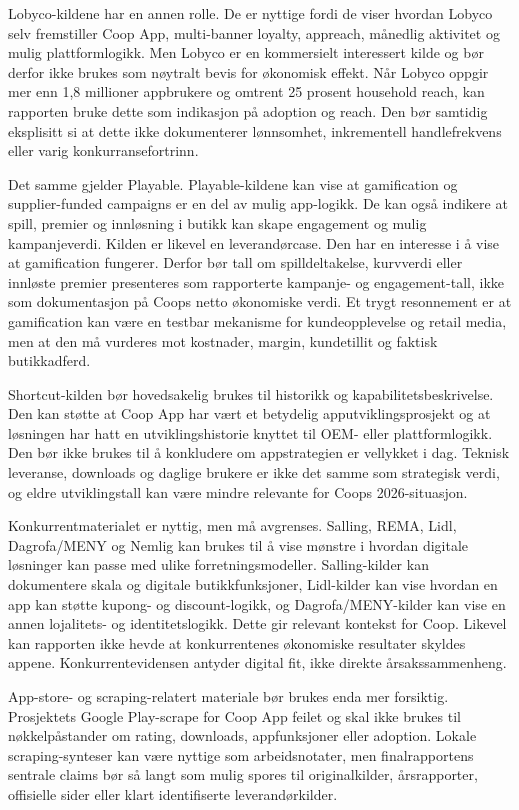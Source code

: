 \documentclass[12pt,a4paper]{article}
\begin{document}
Lobyco-kildene har en annen rolle. De er nyttige fordi de viser hvordan Lobyco selv fremstiller Coop App, multi-banner loyalty, appreach, månedlig aktivitet og mulig plattformlogikk. Men Lobyco er en kommersielt interessert kilde og bør derfor ikke brukes som nøytralt bevis for økonomisk effekt. Når Lobyco oppgir mer enn 1,8 millioner appbrukere og omtrent 25 prosent household reach, kan rapporten bruke dette som indikasjon på adoption og reach. Den bør samtidig eksplisitt si at dette ikke dokumenterer lønnsomhet, inkrementell handlefrekvens eller varig konkurransefortrinn.

Det samme gjelder Playable. Playable-kildene kan vise at gamification og supplier-funded campaigns er en del av mulig app-logikk. De kan også indikere at spill, premier og innløsning i butikk kan skape engagement og mulig kampanjeverdi. Kilden er likevel en leverandørcase. Den har en interesse i å vise at gamification fungerer. Derfor bør tall om spilldeltakelse, kurvverdi eller innløste premier presenteres som rapporterte kampanje- og engagement-tall, ikke som dokumentasjon på Coops netto økonomiske verdi. Et trygt resonnement er at gamification kan være en testbar mekanisme for kundeopplevelse og retail media, men at den må vurderes mot kostnader, margin, kundetillit og faktisk butikkadferd.

Shortcut-kilden bør hovedsakelig brukes til historikk og kapabilitetsbeskrivelse. Den kan støtte at Coop App har vært et betydelig apputviklingsprosjekt og at løsningen har hatt en utviklingshistorie knyttet til OEM- eller plattformlogikk. Den bør ikke brukes til å konkludere om appstrategien er vellykket i dag. Teknisk leveranse, downloads og daglige brukere er ikke det samme som strategisk verdi, og eldre utviklingstall kan være mindre relevante for Coops 2026-situasjon.

Konkurrentmaterialet er nyttig, men må avgrenses. Salling, REMA, Lidl, Dagrofa/MENY og Nemlig kan brukes til å vise mønstre i hvordan digitale løsninger kan passe med ulike forretningsmodeller. Salling-kilder kan dokumentere skala og digitale butikkfunksjoner, Lidl-kilder kan vise hvordan en app kan støtte kupong- og discount-logikk, og Dagrofa/MENY-kilder kan vise en annen lojalitets- og identitetslogikk. Dette gir relevant kontekst for Coop. Likevel kan rapporten ikke hevde at konkurrentenes økonomiske resultater skyldes appene. Konkurrentevidensen antyder digital fit, ikke direkte årsakssammenheng.

App-store- og scraping-relatert materiale bør brukes enda mer forsiktig. Prosjektets Google Play-scrape for Coop App feilet og skal ikke brukes til nøkkelpåstander om rating, downloads, appfunksjoner eller adoption. Lokale scraping-synteser kan være nyttige som arbeidsnotater, men finalrapportens sentrale claims bør så langt som mulig spores til originalkilder, årsrapporter, offisielle sider eller klart identifiserte leverandørkilder.
\end{document}
